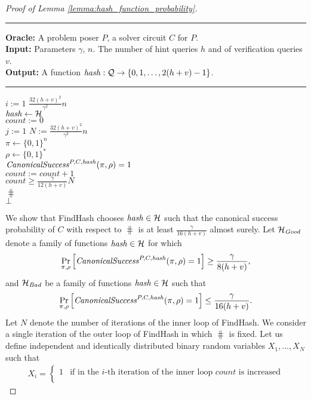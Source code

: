\begin{proof}[Proof of Lemma \ref{lemma:hash_function_probability}]
\begin{codeblock}
  \medskip\hrule
  \textbf{Oracle:} A problem poser $P$, a solver circuit $C$ for $P$.\\
  \textbf{Input:} Parameters $\gamma$, $n$. The number of hint queries $h$ and of verification queries $v$. \\
  \textbf{Output:} A function $\operatorname{\mathit{hash}}:\mathcal{Q} \rightarrow \{0,1, \dots, 2(h+v)-1 \}$.
  \medskip\hrule
  \For $i := 1$ \To $\frac{32(h+v)^2}{\gamma^2}n$ \Do \\
  \IndI $\operatorname{\mathit{hash}} \leftarrow{} \mathcal{H}$ \\
  \IndI $\mathit{count} := 0$ \\
  \IndI \For $j := 1$ \To $N := \frac{32(h+v)^2}{\gamma^2}n$ \Do \\
  \IndII $\pi \leftarrow \{0,1\}^{n} $\\
  \IndII $\rho \leftarrow \{0,1\}^*$ \\
  \IndII \If $\operatorname{\mathit{CanonicalSuccess}}^{P, C, \operatorname{\mathit{hash}}}(\pi, \rho) = 1$ \Then \\
  \IndIII $\mathit{count} := \mathit{count} + 1$\\
  \IndI \If $\mathit{count} \geq \frac{\gamma}{12(h+v)} N$ \Then \\
  \IndII \Return $\hash$\\
  \Return $\bot$
\end{codeblock}
We show that FindHash chooses $\operatorname{\mathit{hash}} \in \mathcal{H}$ such that the canonical success probability of $C$
with respect to $\hash$ is at least $\frac{\gamma}{16(h+v)}$ almost surely.
Let $\mathcal{H}_{\operatorname{\mathit{Good}}}$ denote a family of functions $\operatorname{\mathit{hash}} \in \mathcal{H}$ for which
\begin{align}
  \label{eq:hash_good}
\underset{\pi, \rho}{\Pr}\left[\operatorname{\mathit{CanonicalSuccess}}^{P, C, \operatorname{\mathit{hash}}}(\pi, \rho) = 1\right] \geq \frac{\gamma}{8(h+v)},
\end{align}
and $\mathcal{H}_{\mathit{Bad}}$ be a family of functions $\operatorname{\mathit{hash}} \in \mathcal{H}$ such that
\begin{align}
  \label{eq:hash_bad}
  \underset{\pi, \rho}{\Pr}\left[\operatorname{\mathit{CanonicalSuccess}}^{P, C, \operatorname{\mathit{hash}}}(\pi, \rho) = 1\right] \leq \frac{\gamma}{16(h+v)}.
\end{align}
Let $N$ denote the number of iterations of the inner loop of FindHash.
We consider a single iteration of the outer loop of FindHash in which $\hash$ is fixed.
Let us define independent and identically distributed binary random variables $X_1, \dots, X_{N}$ such that
\begin{align*}
  X_i =
  \begin{cases}
    1 & \text{if in the $i$-th iteration of the inner loop $\mathit{count}$ is increased}\\

\end{cases}
\end{align*}
\end{proof}
